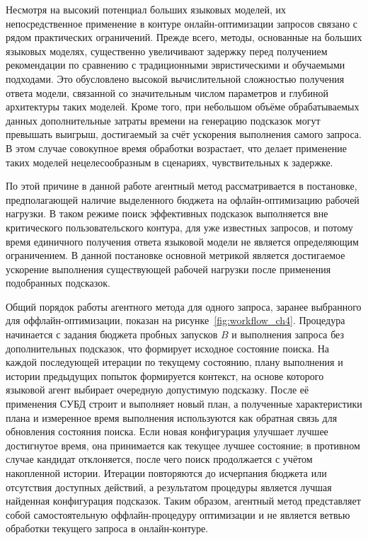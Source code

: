 Несмотря на высокий потенциал больших языковых моделей, их непосредственное применение в контуре онлайн-оптимизации запросов связано с рядом практических ограничений. Прежде всего, методы, основанные на больших языковых моделях, существенно увеличивают задержку перед получением рекомендации по сравнению с традиционными эвристическими и обучаемыми подходами. Это обусловлено высокой вычислительной сложностью получения ответа модели, связанной со значительным числом параметров и глубиной архитектуры таких моделей. Кроме того, при небольшом объёме обрабатываемых данных дополнительные затраты времени на генерацию подсказок могут превышать выигрыш, достигаемый за счёт ускорения выполнения самого запроса. В этом случае совокупное время обработки возрастает, что делает применение таких моделей нецелесообразным в сценариях, чувствительных к задержке.

По этой причине в данной работе агентный метод рассматривается в постановке, предполагающей наличие выделенного бюджета на офлайн-оптимизацию рабочей нагрузки. В таком режиме поиск эффективных подсказок выполняется вне критического пользовательского контура, для уже известных запросов, и потому время единичного получения ответа языковой модели не является определяющим ограничением. В данной постановке основной метрикой является достигаемое ускорение выполнения существующей рабочей нагрузки после применения подобранных подсказок.

Общий порядок работы агентного метода для одного запроса, заранее выбранного для оффлайн-оптимизации, показан на рисунке~\ref{fig:workflow_ch4}. Процедура начинается с задания бюджета пробных запусков \(B\) и выполнения запроса без дополнительных подсказок, что формирует исходное состояние поиска. На каждой последующей итерации по текущему состоянию, плану выполнения и истории предыдущих попыток формируется контекст, на основе которого языковой агент выбирает очередную допустимую подсказку. После её применения СУБД строит и выполняет новый план, а полученные характеристики плана и измеренное время выполнения используются как обратная связь для обновления состояния поиска. Если новая конфигурация улучшает лучшее достигнутое время, она принимается как текущее лучшее состояние; в противном случае кандидат отклоняется, после чего поиск продолжается с учётом накопленной истории. Итерации повторяются до исчерпания бюджета или отсутствия доступных действий, а результатом процедуры является лучшая найденная конфигурация подсказок. Таким образом, агентный метод представляет собой самостоятельную оффлайн-процедуру оптимизации и не является ветвью обработки текущего запроса в онлайн-контуре.

